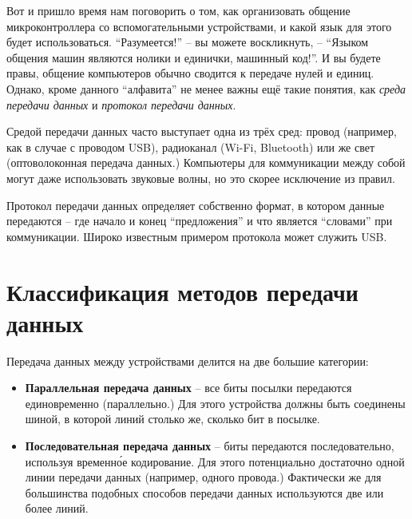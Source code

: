 \documentclass[../sparc.tex]{subfiles}
\begin{document}

Вот и пришло время нам поговорить о том, как организовать общение
микроконтроллера со вспомогательными устройствами, и какой язык для этого будет
использоваться.  ``Разумеется!'' -- вы можете воскликнуть, -- ``Языком общения
машин являются нолики и единички, машинный код!''.  И вы будете правы, общение
компьютеров обычно сводится к передаче нулей и единиц.  Однако, кроме данного
``алфавита'' не менее важны ещё такие понятия, как \emph{среда передачи данных}
и \emph{протокол передачи данных}.

Средой передачи данных часто выступает одна из трёх сред: провод (например, как
в случае с проводом USB), радиоканал (Wi-Fi, Bluetooth) или же свет
(оптоволоконная передача данных.)  Компьютеры для коммуникации между собой могут
даже использовать звуковые волны, но это скорее исключение из правил.

Протокол передачи данных определяет собственно формат, в котором данные
передаются -- где начало и конец ``предложения'' и что является ``словами'' при
коммуникации.  Широко известным примером протокола может служить USB.

\section{Классификация методов передачи данных}


Передача данных между устройствами делится на две большие категории:

\begin{itemize}
\item \textbf{Параллельная передача данных} -- все биты посылки передаются
  единовременно (параллельно.)  Для этого устройства должны быть соединены
  шиной, в которой линий столько же, сколько бит в посылке.
\item \textbf{Последовательная передача данных} -- биты передаются
  последовательно, используя временн\'{о}е кодирование.  Для этого потенциально
  достаточно одной линии передачи данных (например, одного провода.) Фактически
  же для большинства подобных способов передачи данных используются две или
  более линий.
\end{itemize}
\end{document}
